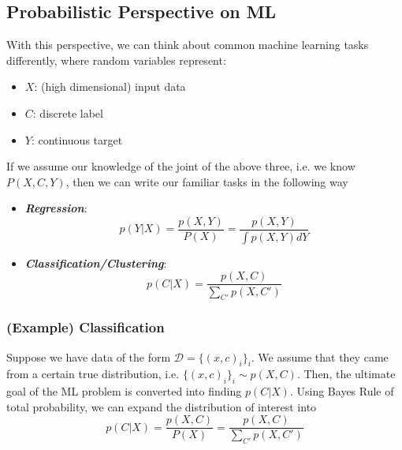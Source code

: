 \documentclass[11pt]{article}
\begin{document}
\subsection{Probabilistic Perspective on ML}
With this perspective, we can think about common machine learning tasks differently, where random variables represent:
\begin{itemize}
    \item $X$: (high dimensional) input data
    \item $C$: discrete label
    \item $Y$: continuous target
\end{itemize}
If we assume our knowledge of the joint of the above three, i.e. we know $P(X,C,Y)$, then we can write our familiar tasks in the following way
\begin{itemize}
    \item \textit{\textbf{Regression}}:
        \begin{equation*}
            p(Y|X) = \frac{p(X,Y)}{P(X)} = \frac{p(X,Y)}{\int p(X,Y)dY}
        \end{equation*}
    \item \textit{\textbf{Classification/Clustering}}:
        \begin{equation*}
            p(C|X) = \frac{p(X,C)}{\sum_{C'}p(X,C')}
        \end{equation*}
\end{itemize}

\subsubsection{(Example) Classification} Suppose we have data of the form $\mathcal{D} = \{(x,c)_i\}_i$. We assume that they came from a certain true distribution, i.e. $\{(x,c)_i\}_i \sim p(X,C)$. Then, the ultimate goal of the ML problem is converted into finding $p(C|X)$. Using Bayes Rule of total probability, we can expand the distribution of interest into
\begin{equation*}
    p(C | X)= \frac{p(X,C)}{P(X)} =\frac{p(X, C)}{\sum_{C'} p(X, C')}
\end{equation*}
\end{document}
